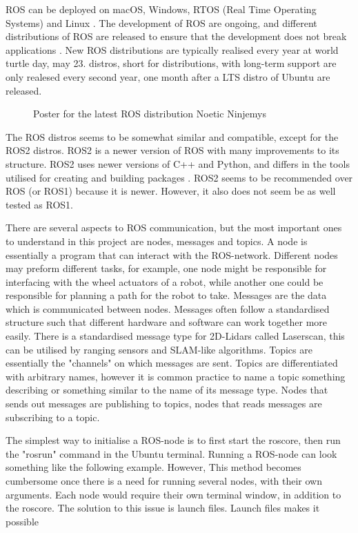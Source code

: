 ROS can be deployed on macOS, Windows, RTOS (Real Time Operating Systems) and Linux \cite{WhyROS}. The development of ROS are ongoing, and different distributions of ROS are released to ensure that the development does not break applications \cite{REP2000}. New ROS distributions are typically realised every year at world turtle day, may 23. distros, short for distributions, with long-term support are only realesed every second year, one month after a LTS distro of Ubuntu are released. 

\begin{figure}[H]
\centering

  \caption{Poster for the latest ROS distribution Noetic Ninjemys \cite{ROSLogo}}
  \label{fig:noeticLogo}
\end{figure}

The ROS distros seems to be somewhat similar and compatible, except for the ROS2 distros. ROS2 is a newer version of ROS with many improvements to its structure. ROS2 uses newer versions of C++ and Python, and differs in the tools utilised for creating and building packages \cite{ROSChanges}. ROS2 seems to be recommended over ROS (or ROS1) because it is newer. However, it also does not seem be as well tested as ROS1.

There are several aspects to ROS communication, but the most important ones to understand in this project are nodes, messages and topics. A node is essentially a program that can interact with the ROS-network. Different nodes may preform different tasks, for example, one node might be responsible for interfacing with the wheel actuators of a robot, while another one could be responsible for planning a path for the robot to take. Messages are the data which is communicated between nodes. Messages often follow a standardised structure such that different hardware and software can work together more easily. There is a standardised message type for 2D-Lidars called Laserscan, this can be utilised by ranging sensors and SLAM-like algorithms.  Topics are essentially the "channels" on which messages are sent. Topics are differentiated with arbitrary names, however it is common practice to name a topic something describing or something similar to the name of its message type. Nodes that sends out messages are publishing to topics, nodes that reads messages are subscribing to a topic. 

The simplest way to initialise a ROS-node is to first start the roscore, then run the "rosrun" command in the Ubuntu terminal. Running a ROS-node can look something like the following example.  
However, This method becomes cumbersome once there is a need for running several nodes, with their own arguments. Each node would require their own terminal window, in addition to the roscore. The solution to this issue is launch files. Launch files makes it possible 

